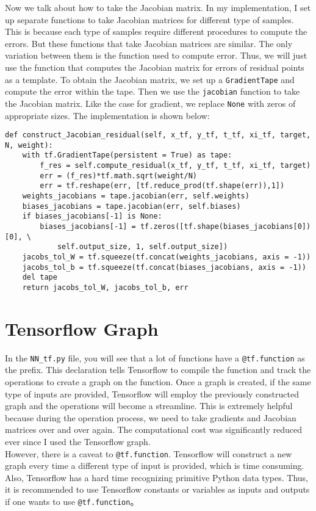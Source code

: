 \documentclass{article}
\begin{document}
Now we talk about how to take the Jacobian matrix. In my implementation, I set up separate functions to take Jacobian matrices for different type of samples. This is because each type of samples require different procedures to compute the errors. But these functions that take Jacobian matrices are similar. The only variation between them is the function used to compute error. Thus, we will just use the function that computes the Jacobian matrix for errors of residual points as a template. To obtain the Jacobian matrix, we set up a \texttt{GradientTape} and compute the error within the tape. Then we use the \texttt{jacobian} function to take the Jacobian matrix. Like the case for gradient, we replace \texttt{None} with zeros of appropriate sizes. The implementation is shown below: 
\begin{lstlisting}
def construct_Jacobian_residual(self, x_tf, y_tf, t_tf, xi_tf, target, N, weight):
	with tf.GradientTape(persistent = True) as tape:
		f_res = self.compute_residual(x_tf, y_tf, t_tf, xi_tf, target)
		err = (f_res)*tf.math.sqrt(weight/N)
		err = tf.reshape(err, [tf.reduce_prod(tf.shape(err)),1])
	weights_jacobians = tape.jacobian(err, self.weights)
	biases_jacobians = tape.jacobian(err, self.biases)
	if biases_jacobians[-1] is None:
		biases_jacobians[-1] = tf.zeros([tf.shape(biases_jacobians[0])[0], \
			self.output_size, 1, self.output_size])
	jacobs_tol_W = tf.squeeze(tf.concat(weights_jacobians, axis = -1))
	jacobs_tol_b = tf.squeeze(tf.concat(biases_jacobians, axis = -1))
	del tape
	return jacobs_tol_W, jacobs_tol_b, err
\end{lstlisting}

\section{Tensorflow Graph}
In the \texttt{NN\_tf.py} file, you will see that a lot of functions have a \texttt{@tf.function} as the prefix. This declaration tells Tensorflow to compile the function and track the operations to create a graph on the function. Once a graph is created, if the same type of inputs are provided, Tensorflow will employ the previously constructed graph and the operations will become a streamline. This is extremely helpful because during the operation process, we need to take gradients and Jacobian matrices over and over again. The computational cost was significantly reduced ever since I used the Tensorflow graph. \\

However, there is a caveat to \texttt{@tf.function}. Tensorflow will construct a new graph every time a different type of input is provided, which is time consuming. Also, Tensorflow has a hard time recognizing primitive Python data types. Thus, it is recommended to use Tensorflow constants or variables as inputs and outputs if one wants to use \texttt{@tf.function}。
\end{document}
